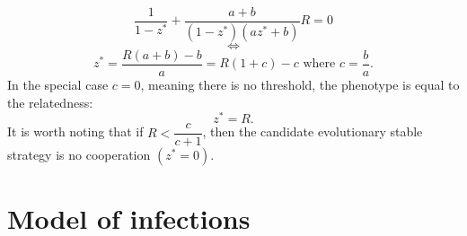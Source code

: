 \documentclass[10pt]{article}
\begin{document}
\begin{multicols}{2}
    \begin{equation}
  \dfrac{1}{ 1 - z^* } + \dfrac{a +b}{(1- z^*)(a z^* +b)}R =0
  \end{equation}
  \begin{equation}
  \iff
  \end{equation}
  \begin{equation}
  z^*=\dfrac{R(a+b)-b}{a}=R(1+c)-c \text{ where }c=\dfrac{b}{a}.
  \end{equation}
  In the special case $c=0$, meaning there is no threshold, the phenotype is equal to the relatedness:
  \begin{equation}
  z^*=R.
  \end{equation} 
  It is worth noting that if $R<\dfrac{c}{c+1}$, then the candidate evolutionary stable strategy is no cooperation $(z^*=0)$.
\section*{Model of infections}

\end{multicols}
\end{document}

